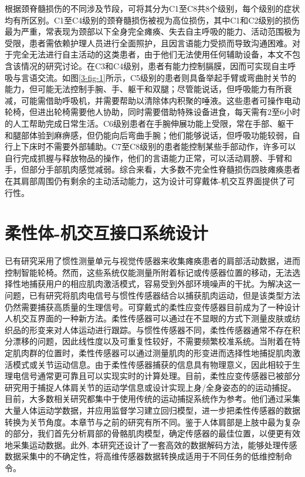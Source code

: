 根据颈脊髓损伤的不同涉及节段，可将其分为C1至C8共8个级别，每个级别的症状均有所区别。C1至C4级别的颈脊髓损伤被视为高位损伤，其中C1和C2级别的损伤最为严重，常表现为颈部以下全身完全瘫痪、失去自主呼吸的能力、活动范围极为受限，患者需依赖护理人员进行全面照护，且因言语能力受损而导致沟通困难。对于完全无法进行自主活动的这类患者，由于他们无法使用任何辅助设备，本文不包含该情况的研究讨论。在C3和C4级别，患者有能力控制膈膜，因而可实现自主呼吸与言语交流。如图\ref{3-fig-1}所示，C5级别的患者则具备举起手臂或弯曲肘关节的能力，但可能无法控制手腕、手、躯干和双腿；尽管能说话，但呼吸能力有所衰减，可能需借助呼吸机，并需要帮助以清除体内积聚的唾液。这些患者可操作电动轮椅，但进出轮椅需要他人协助，同时需要借助特殊设备进食，每天需有2至6小时的人工帮助完成日常生活。C6级别患者在手腕伸展功能上受限，常在手部、躯干和腿部体验到麻痹感，但仍能向后弯曲手腕；他们能够说话，但呼吸功能较弱，自行上下床时不需要外部辅助。C7至C8级别的患者能控制某些手部动作，许多可以自行完成抓握与释放物品的操作，他们的言语能力正常，可以活动肩膀、手臂和手，但部分手部肌肉感觉减弱。综合来看，大多数不完全性脊髓损伤四肢瘫痪患者在其肩部周围仍有剩余的主动活动能力\cite{shefflerNeuromuscularElectricalStimulation2007}，这为设计可穿戴体-机交互界面提供了可行性。

\section{柔性体-机交互接口系统设计} 

已有研究采用了惯性测量单元与视觉传感器来收集瘫痪患者的肩部活动数据，进而控制智能轮椅\cite{thorpUpperBodyBasedPower2016d,seanez-gonzalezCursorControlKalman2014a}。然而，这些系统仅能测量所附着标记或传感器位置的移动，无法选择性地捕获用户的相应肌肉激活模式，容易受到外部环境噪声的干扰。为解决这一问题，已有研究将肌肉电信号与惯性传感器结合以捕获肌肉运动\cite{rizzoglioHybridBodyMachineInterface2020}，但是该类型方法仍然需要捕获高质量的生理信号。可穿戴式的柔性应变传感器目前成为了一种设计人机交互界面的一种新方法\cite{dongStretchableHumanMachine2020}。柔性传感器可以通过在不显眼的方式下测量皮肤或纺织品的形变来对人体运动进行跟踪。与惯性传感器不同，柔性传感器通常不存在积分漂移的问题，因此线性度以及可重复性较好，不需要频繁校准系统。当附着在特定肌肉群的位置时，柔性传感器可以通过测量肌肉的形变进而选择性地捕捉肌肉激活模式或关节运动信息。由于柔性传感器捕获的信息具有物理意义，因此相较于生理电信号通常更可靠且可以实现实时的计算处理。目前，柔性应变传感器已被部分研究用于捕捉人体肩关节的运动学信息\cite{jinSoftSensingShirt2020,leePrintableSkinAdhesive2016,samper-escuderoEfficientMultiaxialShoulderMotion2020}或设计实现上身/全身姿态的的运动捕捉\cite{contreras-gonzalezEfficientUpperLimb2020,ogataEstimatingMovementsHuman2019,kimDeepFullBodyMotion2019}。目前，大多数相关研究都集中于使用传统的运动捕捉系统作为参考。他们通过采集大量人体运动学数据，并应用监督学习建立回归模型，进一步把柔性传感器的数据转换为关节角度。本章节与之前的研究有所不同。鉴于人体肩部是上肢中最为复杂的部分，我们首先分析肩部的骨骼肌肉模型，确定传感器的最佳位置，以便更有效地采集运动数据。此外, 本研究还设计了一套高效的数据解码方法，能够处理传感数据采集中的不确定性，将高维传感器数据转换成适用于不同任务的低维控制命令。

